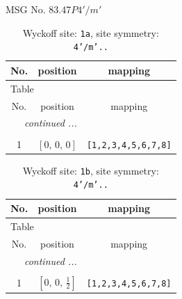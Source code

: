 \documentclass[fleqn,8pt]{jsarticle}
\begin{document}
\setcounter{MaxMatrixCols}{32}

\renewcommand{\tablename}{Table~}
\renewcommand{\figurename}{Figure~}
\begin{center}
\LARGE
MSG No. 83.47\quad$P4'/m'$
\end{center}
\renewcommand{\arraystretch}{1.2}
\begin{longtable}{ccc}
\caption{Wyckoff site: {\tt 1a}, site symmetry: {\tt 4'/m'..}}
 \\
 \hline \hline
No. & position & mapping \\ \hline \endfirsthead

\multicolumn{2}{l}{\tablename\ \thetable{}} \\
 \hline \hline
No. & position & mapping \\ \hline \endhead

 \hline \hline
\multicolumn{2}{r}{\footnotesize\it continued ...} \\ \endfoot

 \hline \hline
\multicolumn{2}{r}{} \\ \endlastfoot

1 & $\left[ 0,\, 0,\, 0 \right]$ & {\tt [1,2,3,4,5,6,7,8]} \\
\end{longtable}
\renewcommand{\arraystretch}{1.2}
\begin{longtable}{ccc}
\caption{Wyckoff site: {\tt 1b}, site symmetry: {\tt 4'/m'..}}
 \\
 \hline \hline
No. & position & mapping \\ \hline \endfirsthead

\multicolumn{2}{l}{\tablename\ \thetable{}} \\
 \hline \hline
No. & position & mapping \\ \hline \endhead

 \hline \hline
\multicolumn{2}{r}{\footnotesize\it continued ...} \\ \endfoot

 \hline \hline
\multicolumn{2}{r}{} \\ \endlastfoot

1 & $\left[ 0,\, 0,\, \frac{1}{2} \right]$ & {\tt [1,2,3,4,5,6,7,8]} \\
\end{longtable}
\renewcommand{\arraystretch}{1.2}
\end{document}
